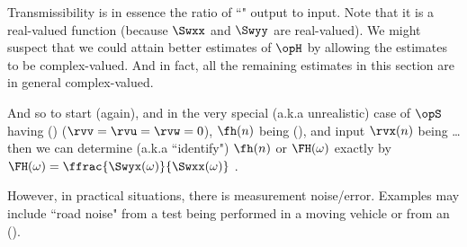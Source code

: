 Transmissibility is in essence the ratio of ``"  
output to  input.
Note that it is a real-valued function (because $\Swxx$ and $\Swyy$ are real-valued).
We might suspect that we could attain better estimates of $\opH$ by allowing the estimates to be complex-valued. %
And in fact, all the remaining estimates in this section are in general complex-valued.

And so to start (again), and in the very special (a.k.a unrealistic) case of $\opS$ having 
 ()
($\rvv=\rvu=\rvw=0$),
$\fh(n)$ being  (),
and input $\rvx(n)$ being \ldots
then we can determine (a.k.a ``identify") $\fh(n)$ or $\FH(\omega)$
exactly by $\FH(\omega)=\ffrac{\Swyx(\omega)}{\Swxx(\omega)}$ .

However, in practical situations, there is measurement noise/error. %
Examples may include
``road noise" from a test being performed in a moving vehicle or  from an 
 ().

